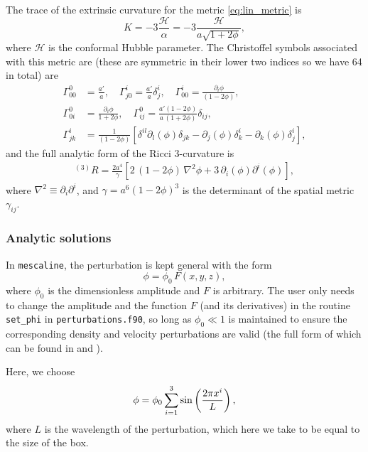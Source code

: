 \documentclass[a4paper]{article}
\newcommand{\pd}{\partial}
\newcommand{\mesc}{\texttt{mescaline}}
\begin{document}
The trace of the extrinsic curvature for the metric \eqref{eq:lin_metric} is 
\begin{equation}
	K = - 3 \frac{\mathcal{H}}{\alpha} = -3 \frac{\mathcal{H}}{a \sqrt{1+2\phi}},
\end{equation}
where $\mathcal{H}$ is the conformal Hubble parameter. The Christoffel symbols associated with this metric are (these are symmetric in their lower two indices so we have 64 in total) are
\begin{align}
	\Gamma^0_{00} &= \frac{a'}{a}, \quad \Gamma^i_{j0} = \frac{a'}{a}\delta^i_j, \quad \Gamma^i_{00} = \frac{\pd_i \phi}{(1-2\phi)}, \\
	\Gamma^0_{0i} &= \frac{\pd_i \phi}{1 + 2\phi}, \quad \Gamma^0_{ij} = \frac{a'(1-2\phi)}{a\,(1+2\phi)}\delta_{ij}, \\
	\Gamma^i_{jk} &= \frac{1}{(1-2\phi)}\left[\delta^{il}\pd_l(\phi) \delta_{jk} -\pd_j (\phi) \delta^i_k - \pd_k (\phi) \delta^i_j \right], \label{eq:spatial_gam}
\end{align} 
and the full analytic form of the Ricci 3-curvature is
\begin{align}
	{}^{(3)} R = \frac{2 a^4 }{\gamma} \left[ 2 \, (1-2\phi)\,\nabla^2 \phi + 3 \, \pd_i (\phi) \pd^i (\phi) \right],
\end{align}
where $\nabla^2 \equiv \pd_i \pd^i$, and $\gamma = a^6 (1-2\phi)^3$ is the determinant of the spatial metric $\gamma_{ij}$. 


\subsubsection{Analytic solutions}

In \mesc, the perturbation is kept general with the form
\begin{equation}
	\phi = \phi_0 \, F(x,y,z),
\end{equation}
where $\phi_0$ is the dimensionless amplitude and $F$ is arbitrary. The user only needs to change the amplitude and the function $F$ (and its derivatives) in the routine \texttt{set\_phi} in \texttt{perturbations.f90}, so long as $\phi_0 \ll 1$ is maintained to ensure the corresponding density and velocity perturbations are valid (the full form of which can be found in \citet{macpherson2019b} and \citet{macpherson2019c}).

Here, we choose
\begin{equation} \label{eq:phi_form}
	\phi = \phi_0 \sum_{i=1}^3 {\rm sin}\left(\frac{2\pi x^i}{L}\right),
\end{equation}
where $L$ is the wavelength of the perturbation, which here we take to be equal to the size of the box. 
\end{document}
